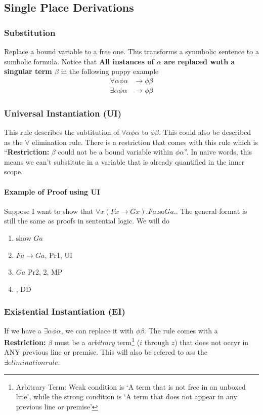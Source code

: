 \documentclass[10pt]{article}
\renewcommand{\implies}{\rightarrow}
\begin{document}
\subsection{Single Place Derivations}
\subsubsection{Substitution}
Replace a bound variable to a free one. This transforms a synmbolic sentence to a sumbolic formula. Notice that \textbf{All instances of $\alpha$ are replaced wuth a singular term $\beta$} in the following puppy example
\begin{align*}
    \forall \alpha \phi \alpha &\implies \phi \beta \\
    \exists \alpha \phi \alpha &\implies \phi \beta
\end{align*}

\subsubsection{Universal Instantiation (UI)} This rule describes the subtitution of $\forall \alpha \phi \alpha$ to $ \phi \beta$. This could also be described as the $\forall$ elimination rule. There is a restriction that comes with this rule which is ``\textbf{Restriction:} $\beta$ could not be a bound variable within $\phi \alpha$''. In naive words, this means we can't substitute in a variable that is already quantified in the inner scope. 

\paragraph{Example of Proof using UI}
Suppose I want to show that $\forall x (Fx\implies Gx). Fa. \text{so} Ga.$. The general format is still the same as proofs in sentential logic. We will do
\begin{enumerate}
    \item show $Ga$
    \item \quad $Fa\implies Ga$, Pr1, UI
    \item \quad $Ga$ Pr2, 2, MP
    \item {}, DD
\end{enumerate}

\subsubsection{Existential Instantiation (EI)} If we have a $\exists \alpha \phi \alpha$, we can replace it with $\phi \beta$. The rule comes with a \textbf{Restriction:} $\beta$ must be a \textit{arbitrary} term\footnote{Arbitrary Term: Weak condition is `A term that is not free in an unboxed line', while the strong condition is `A term that does not appear in any previous line or premise'} ($i$ through $z$) that does not occyr in ANY previous line or premise. This will also be refered to ass the $\exists elimination rule$.  
\end{document}

